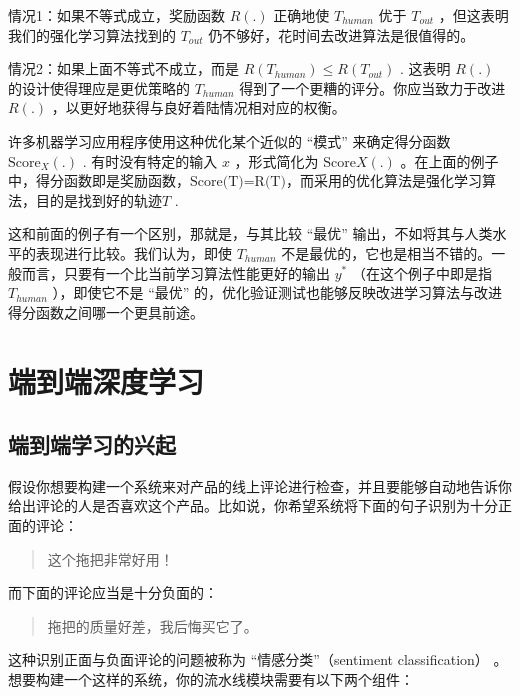 情况1：如果不等式成立，奖励函数 \(R(.)\) 正确地使 \(T_{human}\) 优于
\(T_{out}\) ，但这表明我们的强化学习算法找到的 \(T_{out}\)
仍不够好，花时间去改进算法是很值得的。

情况2：如果上面不等式不成立，而是 \(R(T_{human}) \leq R(T_{out})\) .
这表明 \(R(.)\) 的设计使得理应是更优策略的 \(T_{human}\)
得到了一个更糟的评分。你应当致力于改进 \(R(.)\)
，以更好地获得与良好着陆情况相对应的权衡。

许多机器学习应用程序使用这种优化某个近似的 ``模式'' 来确定得分函数
\(\text{Score}_X(.)\) . 有时没有特定的输入 \(x\) ，形式简化为
\(\text{Score}X(.)\)
。在上面的例子中，得分函数即是奖励函数，\(\text{Score(T)=R(T)}\)，而采用的优化算法是强化学习算法，目的是找到好的轨迹\(T\)
.

这和前面的例子有一个区别，那就是，与其比较 ``最优''
输出，不如将其与人类水平的表现进行比较。我们认为，即使 \(T_{human}\)
不是最优的，它也是相当不错的。一般而言，只要有一个比当前学习算法性能更好的输出
\(y^*\) （在这个例子中即是指 \(T_{human}\) ），即使它不是 ``最优''
的，优化验证测试也能够反映改进学习算法与改进得分函数之间哪一个更具前途。

\hypertarget{ux7aefux5230ux7aefux6df1ux5ea6ux5b66ux4e60}{%
\part{端到端深度学习}\label{ux7aefux5230ux7aefux6df1ux5ea6ux5b66ux4e60}}

\hypertarget{ux7aefux5230ux7aefux5b66ux4e60ux7684ux5174ux8d77}{%
\chapter{端到端学习的兴起}\label{ux7aefux5230ux7aefux5b66ux4e60ux7684ux5174ux8d77}}

假设你想要构建一个系统来对产品的线上评论进行检查，并且要能够自动地告诉你给出评论的人是否喜欢这个产品。比如说，你希望系统将下面的句子识别为十分正面的评论：

\begin{quote}
这个拖把非常好用！
\end{quote}

而下面的评论应当是十分负面的：

\begin{quote}
拖把的质量好差，我后悔买它了。
\end{quote}

这种识别正面与负面评论的问题被称为 ``情感分类''（sentiment
classification）
。想要构建一个这样的系统，你的流水线模块需要有以下两个组件：

